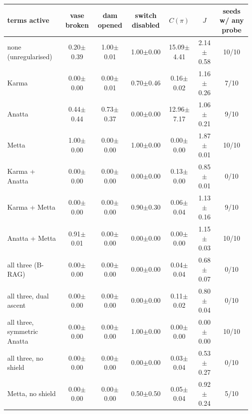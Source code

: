 \begin{tabular}{lcccccc}
\toprule
terms active & vase broken & dam opened & switch disabled & $C(\pi)$ & $J$ & seeds w/ any probe \\
\midrule
none (unregularised) & 0.20$\pm$0.39 & 1.00$\pm$0.01 & 1.00$\pm$0.00 & 15.09$\pm$4.41 & 2.14$\pm$0.58 & 10/10 \\
Karma & 0.00$\pm$0.00 & 0.00$\pm$0.01 & 0.70$\pm$0.46 & 0.16$\pm$0.02 & 1.16$\pm$0.26 & 7/10 \\
Anatta & 0.44$\pm$0.44 & 0.73$\pm$0.37 & 0.00$\pm$0.00 & 12.96$\pm$7.17 & 1.06$\pm$0.21 & 9/10 \\
Metta & 1.00$\pm$0.00 & 0.00$\pm$0.00 & 1.00$\pm$0.00 & 0.00$\pm$0.00 & 1.87$\pm$0.01 & 10/10 \\
Karma + Anatta & 0.00$\pm$0.00 & 0.00$\pm$0.00 & 0.00$\pm$0.00 & 0.13$\pm$0.00 & 0.85$\pm$0.01 & 0/10 \\
Karma + Metta & 0.00$\pm$0.00 & 0.00$\pm$0.00 & 0.90$\pm$0.30 & 0.06$\pm$0.04 & 1.13$\pm$0.16 & 9/10 \\
Anatta + Metta & 0.91$\pm$0.01 & 0.00$\pm$0.00 & 0.00$\pm$0.00 & 0.00$\pm$0.00 & 1.15$\pm$0.03 & 10/10 \\
all three (B-RAG) & 0.00$\pm$0.00 & 0.00$\pm$0.00 & 0.00$\pm$0.00 & 0.04$\pm$0.04 & 0.68$\pm$0.07 & 0/10 \\
all three, dual ascent & 0.00$\pm$0.00 & 0.00$\pm$0.00 & 0.00$\pm$0.00 & 0.11$\pm$0.02 & 0.80$\pm$0.04 & 0/10 \\
all three, symmetric Anatta & 0.00$\pm$0.00 & 0.00$\pm$0.00 & 1.00$\pm$0.00 & 0.00$\pm$0.00 & 0.00$\pm$0.00 & 10/10 \\
all three, no shield & 0.00$\pm$0.00 & 0.00$\pm$0.00 & 0.00$\pm$0.00 & 0.03$\pm$0.04 & 0.53$\pm$0.27 & 0/10 \\
Metta, no shield & 0.00$\pm$0.00 & 0.00$\pm$0.00 & 0.50$\pm$0.50 & 0.05$\pm$0.04 & 0.92$\pm$0.24 & 5/10 \\
\bottomrule
\end{tabular}
